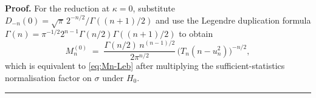 \documentclass{article}%
\newenvironment{proof}[1][Proof]{\noindent\textbf{#1.} }{\ \rule{0.5em}{0.5em}}
\newcommand{\R}{\mathbb{R}}
\newcommand{\dd}{\,\mathrm{d}}
\begin{document}
\begin{proof}
For the reduction at \(\kappa=0\), substitute
\(D_{-n}(0)=\sqrt\pi\,2^{-n/2}/\Gamma((n+1)/2)\) and use the Legendre
duplication formula
\(\Gamma(n)=\pi^{-1/2}2^{n-1}\Gamma(n/2)\Gamma((n+1)/2)\)
to obtain
\[
  M_n^{(0)} \;=\; \frac{\Gamma(n/2)\,n^{(n-1)/2}}{2\pi^{n/2}}\,
                  \bigl(T_n(n-u_n^2)\bigr)^{-n/2},
\]
which is equivalent to \eqref{eq:Mn-Leb} after multiplying the
sufficient-statistics normalisation factor on \(\sigma\) under
\(H_0\).
\end{proof}



\end{document}
